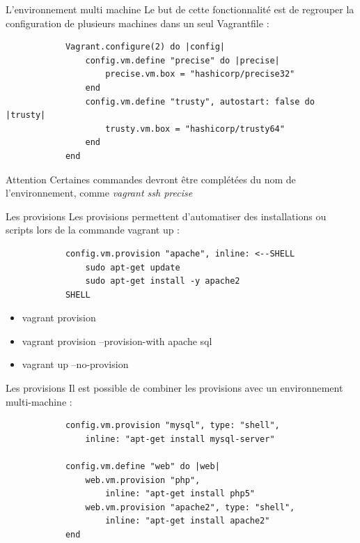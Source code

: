 \documentclass{beamer}
\begin{document}
    \begin{frame}[containsverbatim]{L'environnement multi machine}
        Le but de cette fonctionnalité est de regrouper la configuration de plusieurs machines dans un seul Vagrantfile :
        \begin{verbatim}
            Vagrant.configure(2) do |config|
                config.vm.define "precise" do |precise|
                    precise.vm.box = "hashicorp/precise32"
                end
                config.vm.define "trusty", autostart: false do |trusty|
                    trusty.vm.box = "hashicorp/trusty64"
                end
            end
        \end{verbatim}
        \begin{alertblock}{Attention}
            Certaines commandes devront être complétées du nom de l'environnement, comme \em{vagrant ssh precise}
        \end{alertblock}
    \end{frame}

    \begin{frame}[containsverbatim]{Les provisions}
        Les provisions permettent d'automatiser des installations ou scripts lors de la commande vagrant up :
        \begin{verbatim}
            config.vm.provision "apache", inline: <--SHELL
                sudo apt-get update
                sudo apt-get install -y apache2
            SHELL
        \end{verbatim}
        \begin{itemize}
            \item{vagrant provision}
            \item{vagrant provision --provision-with apache sql}
            \item{vagrant up --no-provision}
        \end{itemize}
    \end{frame}

    \begin{frame}[containsverbatim]{Les provisions}
        Il est possible de combiner les provisions avec un environnement multi-machine :
        \begin{verbatim}
            config.vm.provision "mysql", type: "shell", 
                inline: "apt-get install mysql-server"
            
            config.vm.define "web" do |web|
                web.vm.provision "php", 
                    inline: "apt-get install php5"
                web.vm.provision "apache2", type: "shell", 
                    inline: "apt-get install apache2"
            end
        \end{verbatim}
    \end{frame}
\end{document}
